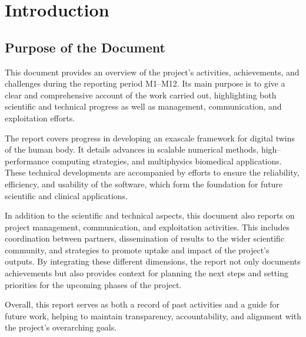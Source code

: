 \documentclass[a4paper,12pt, numbers]{article}
\begin{document}
	\vspace*{2cm}
	
	\disclaimer
	
	\newpage
	
	\tableofcontents %
	
	\newpage
	
	\section{{Introduction}}
	
	
	\subsection{Purpose of the Document}
	
	This document provides an overview of the project’s activities, achievements, and challenges during the reporting period M1–M12. Its main purpose is to give a clear and comprehensive account of the work carried out, highlighting both scientific and technical progress as well as management, communication, and exploitation efforts. 
	
	The report covers progress in developing an exascale framework for digital twins of the human body. It details advances in scalable numerical methods, high--perfor\-mance computing strategies, and multiphysics biomedical applications. These technical developments are accompanied by efforts to ensure the reliability, efficiency, and usability of the software, which form the foundation for future scientific and clinical applications.
	
	In addition to the scientific and technical aspects, this document also reports on project management, communication, and exploitation activities. This includes coordination between partners, dissemination of results to the wider scientific community, and strategies to promote uptake and impact of the project’s outputs. By integrating these different dimensions, the report not only documents achievements but also provides context for planning the next steps and setting priorities for the upcoming phases of the project.
	
	Overall, this report serves as both a record of past activities and a guide for future work, helping to maintain transparency, accountability, and alignment with the project’s overarching goals.
	
	
	
	
\end{document}
